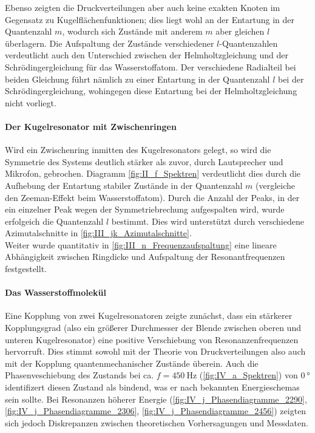\documentclass[../main.tex]{subfiles}
\begin{document}
    Ebenso zeigten die Druckverteilungen aber auch keine exakten Knoten im Gegensatz zu Kugelflächenfunktionen; dies liegt wohl an der Entartung in der Quantenzahl $m$, wodurch sich Zustände mit anderem $m$ aber gleichen $l$ überlagern. Die Aufspaltung der Zustände verschiedener $l$-Quantenzahlen verdeutlicht auch den Unterschied zwischen der Helmholtzgleichung und der Schrödingergleichung für das Wasserstoffatom. Der verschiedene Radialteil bei beiden Gleichung führt nämlich zu einer Entartung in der Quantenzahl $l$ bei der Schrödingergleichung, wohingegen diese Entartung bei der Helmholtzgleichung nicht vorliegt.

\paragraph{Der Kugelresonator mit Zwischenringen}
    Wird ein Zwischenring inmitten des Kugelresonators gelegt, so wird die Symmetrie des Systems deutlich stärker als zuvor, durch Lautsprecher und Mikrofon, gebrochen. Diagramm \ref{fig:II_f_Spektren} verdeutlicht dies durch die Aufhebung der Entartung stabiler Zustände in der Quantenzahl $m$ (vergleiche den Zeeman-Effekt beim Wasserstoffatom). Durch die Anzahl der Peaks, in der ein einzelner Peak wegen der Symmetriebrechung aufgespalten wird, wurde erfolgeich die Quantenzahl $l$ bestimmt. Dies wird unterstützt durch verschiedene Azimutalschnitte in \ref{fig:III_jk_Azimutalschnitte}.\\

    Weiter wurde quantitativ in \ref{fig:III_n_Frequenzaufspaltung} eine lineare Abhängigkeit zwischen Ringdicke und Aufspaltung der Resonantfrequenzen festgestellt.

\paragraph{Das Wasserstoffmolekül}
    Eine Kopplung von zwei Kugelresonatoren zeigte zunächst, dass ein stärkerer Kopplungsgrad (also ein größerer Durchmesser der Blende zwischen oberen und unteren Kugelresonator) eine positive Verschiebung von Resonanzenfrequenzen hervorruft. Dies stimmt sowohl mit der Theorie von Druckverteilungen also auch mit der Kopplung quantenmechanischer Zustände überein. Auch die Phasenveschiebung des Zustands bei ca. $f=\SI{450}{\hertz}$ (\ref{fig:IV_a_Spektren}) von $\SI{0}{\degree}$ identifizert diesen Zustand als bindend, was er nach bekannten Energieschemas sein sollte. Bei Resonanzen höherer Energie (\ref{fig:IV_j_Phasendiagramme_2290}, \ref{fig:IV_j_Phasendiagramme_2306}, \ref{fig:IV_j_Phasendiagramme_2456}) zeigten sich jedoch Diskrepanzen zwischen theoretischen Vorhersagungen und Messdaten.
\end{document}
